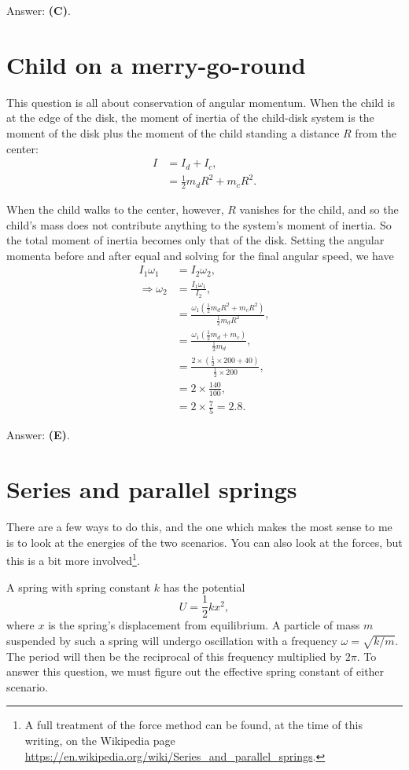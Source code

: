 \documentclass[11pt]{paper}
\newcommand{\answer}[1]{Answer: \textbf{(#1)}.}
\begin{document}
\answer{C}

\section{Child on a merry-go-round}
This question is all about conservation of angular momentum.  When the child is at the edge of the disk, the moment of inertia of the child-disk system is the moment of the disk plus the moment of the child standing a distance $R$ from the center:
\begin{align}
	I &= I_d + I_c,\\
	&= \frac{1}{2}m_dR^2 + m_cR^2.
\end{align}

When the child walks to the center, however, $R$ vanishes for the child, and so the child's mass does not contribute anything to the system's moment of inertia.  So the total moment of inertia becomes only that of the disk.  Setting the angular momenta before and after equal and solving for the final angular speed, we have
\begin{align}
	I_1 \omega_1 &= I_2 \omega_2,\\
	\Rightarrow \omega_2 &= \frac{I_1 \omega_1}{I_2},\\
	&= \frac{\omega_1\left(\frac{1}{2}m_dR^2 + m_cR^2\right)}{\frac{1}{2}m_dR^2},\\
	&=\frac{\omega_1\left(\frac{1}{2}m_d + m_c\right)}{\frac{1}{2}m_d},\\
	&=\frac{2\times\left(\frac{1}{2}\times200 + 40\right)}{\frac{1}{2}\times200},\\
	&= 2\times\frac{140}{100},\\
	&=2\times\frac{7}{5} = 2.8.
	\end{align}
	
\answer{E}

\section{Series and parallel springs}
There are a few ways to do this, and the one which makes the most sense to me is to look at the energies of the two scenarios.  You can also look at the forces, but this is a bit more involved\footnote{A full treatment of the force method can be found, at the time of this writing, on the Wikipedia page \url{https://en.wikipedia.org/wiki/Series_and_parallel_springs}.}.

A spring with spring constant $k$ has the potential
\begin{equation}
	U = \frac{1}{2}kx^2,
\end{equation}
where $x$ is the spring's displacement from equilibrium.  A particle of mass $m$ suspended by such a spring will undergo oscillation with a frequency $\omega = \sqrt{k/m}$.  The period will then be the reciprocal of this frequency multiplied by $2\pi$.  To answer this question, we must figure out the effective spring constant of either scenario.
\end{document}
